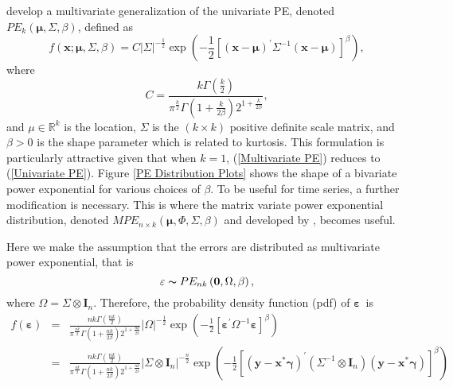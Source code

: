 \citet{Gome:Gome:Mari:1998} develop a multivariate generalization
of the univariate PE, denoted $PE_{k}\left(\mathbf{\mu},\Sigma,\beta\right)$,
defined as
\begin{equation}
f\left(\mathbf{x};\mathbf{\mu},\Sigma,\beta\right)=C\left\vert \Sigma\right\vert ^{-\frac{1}{2}}\exp\left(-\frac{1}{2}\left[\left(\mathbf{x}-\mathbf{\mu}\right)^{\prime}\Sigma^{-1}\left(\mathbf{x}-\mathbf{\mu}\right)\right]^{\beta}\right),\label{Multivariate PE}
\end{equation}
where
\[
C=\frac{k\Gamma\left(\frac{k}{2}\right)}{\pi^{\frac{k}{2}}\Gamma\left(1+\frac{k}{2\beta}\right)2^{1+\frac{k}{2\beta}}},
\]
and $\mu\in\mathbb{R}^{k}$ is the location, $\Sigma$ is the $\left(k\times k\right)$
positive definite scale matrix, and $\beta>0$ is the shape parameter
which is related to kurtosis. This formulation is particularly attractive
given that when $k=1$, (\ref{Multivariate PE}) reduces to (\ref{Univariate PE}).
Figure \ref{PE Distribution Plots} shows the shape of a bivariate
power exponential for various choices of $\beta$. To be useful for
time series, a further modification is necessary. This is where the
matrix variate power exponential distribution, denoted $MPE_{n\times k}\left(\mathbf{\mu},\Phi,\Sigma,\beta\right)$
and developed by \citet{Sanch:Gome:Mari:2002}, becomes useful.

Here we make the assumption that the errors are distributed as multivariate
power exponential, that is
\[
\mathbf{\varepsilon}\thicksim PE_{nk}\left(\mathbf{0},\Omega,\beta\right),
\]
where $\Omega=\Sigma\otimes\mathbf{I}_{n}$. Therefore, the probability
density function (pdf) of $\mathbf{\varepsilon}$\ is
\begin{eqnarray*}
f\left(\mathbf{\varepsilon}\right) & = & \frac{nk\Gamma\left(\frac{nk}{2}\right)}{\pi^{\frac{nk}{2}}\Gamma\left(1+\frac{nk}{2\beta}\right)2^{1+\frac{nk}{2\beta}}}\left\vert \Omega\right\vert ^{-\frac{1}{2}}\exp\left(-\frac{1}{2}\left[\mathbf{\varepsilon}^{\prime}\Omega^{-1}\mathbf{\varepsilon}\right]^{\beta}\right)\\
 & = & \frac{nk\Gamma\left(\frac{nk}{2}\right)}{\pi^{\frac{nk}{2}}\Gamma\left(1+\frac{nk}{2\beta}\right)2^{1+\frac{nk}{2\beta}}}\left\vert \Sigma\otimes\mathbf{I}_{n}\right\vert ^{-\frac{n}{2}}\exp\left(-\frac{1}{2}\left[\left(\mathbf{y}-\mathbf{x}^{\ast}\mathbf{\gamma}\right)^{\prime}\left(\Sigma^{-1}\otimes\mathbf{I}_{n}\right)\left(\mathbf{y}-\mathbf{x}^{\ast}\mathbf{\gamma}\right)\right]^{\beta}\right)
\end{eqnarray*}


